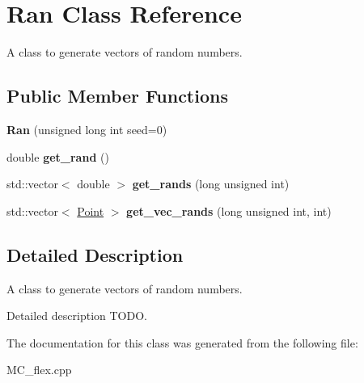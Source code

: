 \hypertarget{class_ran}{}\section{Ran Class Reference}
\label{class_ran}


A class to generate vectors of random numbers.  


\subsection*{Public Member Functions}
\begin{DoxyCompactItemize}
\item 
\mbox{\label{class_ran_af481229a857d69a9520b3eb3007a471b}} 
{\bfseries Ran} (unsigned long int seed=0)
\item 
\mbox{\label{class_ran_a28a4a034864260c947aa5b8eb7d32a0d}} 
double {\bfseries get\+\_\+rand} ()
\item 
\mbox{\label{class_ran_a75d4f1bfd76c33977b78c5f51973df1b}} 
std\+::vector$<$ double $>$ {\bfseries get\+\_\+rands} (long unsigned int)
\item 
\mbox{\label{class_ran_aa392309234eac7fd4491b6ef5e7e7fe6}} 
std\+::vector$<$ \hyperlink{class_point}{Point} $>$ {\bfseries get\+\_\+vec\+\_\+rands} (long unsigned int, int)
\end{DoxyCompactItemize}


\subsection{Detailed Description}
A class to generate vectors of random numbers. 

Detailed description T\+O\+DO. 

The documentation for this class was generated from the following file\+:\begin{DoxyCompactItemize}
\item 
M\+C\+\_\+flex.\+cpp\end{DoxyCompactItemize}

